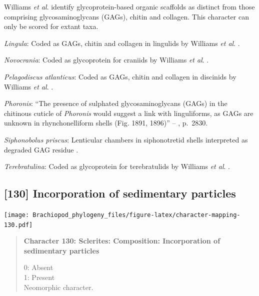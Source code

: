 \documentclass[openany]{book}
\begin{document}
Williams \emph{et al}. \citeyearpar{Williams1996Asupra} identify
glycoprotein-based organic scaffolds as distinct from those comprising
glycosaminoglycans (GAGs), chitin and collagen. This character can only
be scored for extant taxa.

\hypertarget{Lingula-coding-129}{}
\emph{Lingula}: Coded as GAGs, chitin and collagen in lingulids by
Williams \emph{et al}. \citeyearpar{Williams1996Asupra}.

\hypertarget{Novocrania-coding-129}{}
\emph{Novocrania}: Coded as glycoprotein for craniids by Williams
\emph{et al}. \citeyearpar{Williams1996Asupra}.

\hypertarget{Pelagodiscus_atlanticus-coding-129}{}
\emph{Pelagodiscus atlanticus}: Coded as GAGs, chitin and collagen in
discinids by Williams \emph{et al}. \citeyearpar{Williams1996Asupra}.

\hypertarget{Phoronis-coding-129}{}
\emph{Phoronis}: ``The presence of sulphated glycosaminoglycans (GAGs)
in the chitinous cuticle of \emph{Phoronis}
\citep[p.~215]{Herrmann1997Phoronida} would suggest a link with
linguliforms, as GAGs are unknown in rhynchonelliform shells (Fig. 1891,
1896)'' -- \citet{Williams2007Supplement}, p.~2830.

\hypertarget{Siphonobolus_priscus-coding-129}{}
\emph{Siphonobolus priscus}: Lenticular chambers in siphonotretid shells
interpreted as degraded GAG residue
\citep{Williams2004Chemicostructure}.

\hypertarget{Terebratulina-coding-129}{}
\emph{Terebratulina}: Coded as glycoprotein for terebratulids by
Williams \emph{et al}. \citeyearpar{Williams1996Asupra}.

\subsection*{{[}130{]} Incorporation of sedimentary
particles}\label{incorporation-of-sedimentary-particles}

\texttt{[image: Brachiopod\_phylogeny\_files/figure-latex/character-mapping-130.pdf]}

\begin{quote}
\textbf{Character 130: Sclerites: Composition: Incorporation of
sedimentary particles}

0: Absent\\
1: Present\\
Neomorphic character.
\end{quote}
\end{document}
